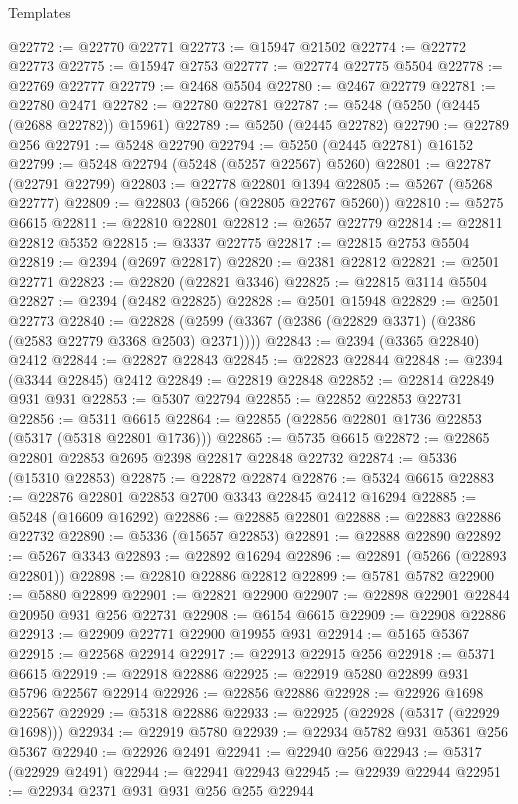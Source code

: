\begin{lexlean}{Templates}
\begin{coremodule}
@22772 := @22770 @22771
@22773 := @15947 @21502
@22774 := @22772 @22773
@22775 := @15947 @2753
@22777 := @22774 @22775 @5504
@22778 := @22769 @22777
@22779 := @2468 @5504
@22780 := @2467 @22779
@22781 := @22780 @2471
@22782 := @22780 @22781
@22787 := @5248 (@5250 (@2445 (@2688 @22782)) @15961)
@22789 := @5250 (@2445 @22782)
@22790 := @22789 @256
@22791 := @5248 @22790
@22794 := @5250 (@2445 @22781) @16152
@22799 := @5248 @22794 (@5248 (@5257 @22567) @5260)
@22801 := @22787 (@22791 @22799)
@22803 := @22778 @22801 @1394
@22805 := @5267 (@5268 @22777)
@22809 := @22803 (@5266 (@22805 @22767 @5260))
@22810 := @5275 @6615
@22811 := @22810 @22801
@22812 := @2657 @22779
@22814 := @22811 @22812 @5352
@22815 := @3337 @22775
@22817 := @22815 @2753 @5504
@22819 := @2394 (@2697 @22817)
@22820 := @2381 @22812
@22821 := @2501 @22771
@22823 := @22820 (@22821 @3346)
@22825 := @22815 @3114 @5504
@22827 := @2394 (@2482 @22825)
@22828 := @2501 @15948
@22829 := @2501 @22773
@22840 := @22828 (@2599 (@3367 (@2386 (@22829 @3371) (@2386 (@2583 @22779 @3368 @2503) @2371))))
@22843 := @2394 (@3365 @22840) @2412
@22844 := @22827 @22843
@22845 := @22823 @22844
@22848 := @2394 (@3344 @22845) @2412
@22849 := @22819 @22848
@22852 := @22814 @22849 @931 @931
@22853 := @5307 @22794
@22855 := @22852 @22853 @22731
@22856 := @5311 @6615
@22864 := @22855 (@22856 @22801 @1736 @22853 (@5317 (@5318 @22801 @1736)))
@22865 := @5735 @6615
@22872 := @22865 @22801 @22853 @2695 @2398 @22817 @22848 @22732
@22874 := @5336 (@15310 @22853)
@22875 := @22872 @22874
@22876 := @5324 @6615
@22883 := @22876 @22801 @22853 @2700 @3343 @22845 @2412 @16294
@22885 := @5248 (@16609 @16292)
@22886 := @22885 @22801
@22888 := @22883 @22886 @22732
@22890 := @5336 (@15657 @22853)
@22891 := @22888 @22890
@22892 := @5267 @3343
@22893 := @22892 @16294
@22896 := @22891 (@5266 (@22893 @22801))
@22898 := @22810 @22886 @22812
@22899 := @5781 @5782
@22900 := @5880 @22899
@22901 := @22821 @22900
@22907 := @22898 @22901 @22844 @20950 @931 @256 @22731
@22908 := @6154 @6615
@22909 := @22908 @22886
@22913 := @22909 @22771 @22900 @19955 @931
@22914 := @5165 @5367
@22915 := @22568 @22914
@22917 := @22913 @22915 @256
@22918 := @5371 @6615
@22919 := @22918 @22886
@22925 := @22919 @5280 @22899 @931 @5796 @22567 @22914
@22926 := @22856 @22886
@22928 := @22926 @1698 @22567
@22929 := @5318 @22886
@22933 := @22925 (@22928 (@5317 (@22929 @1698)))
@22934 := @22919 @5780
@22939 := @22934 @5782 @931 @5361 @256 @5367
@22940 := @22926 @2491
@22941 := @22940 @256
@22943 := @5317 (@22929 @2491)
@22944 := @22941 @22943
@22945 := @22939 @22944
@22951 := @22934 @2371 @931 @931 @256 @255 @22944

\end{coremodule}
\end{lexlean}
